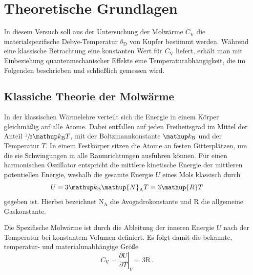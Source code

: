 \section{Theoretische Grundlagen}
\label{sec:theorie}
In diesem Versuch soll aus der Untersuchung der Molwärme $C_\mathrm{V}$
die materialspezifische Debye-Temperatur $\theta_\text{D}$ von Kupfer
bestimmt werden.
Während eine klassische Betrachtung eine konstanten Wert für $C_\mathrm{V}$
liefert, erhält man mit Einbeziehung quantenmechanischer Effekte eine
Temperaturabhängigkeit, die im Folgenden beschrieben und schließlich 
gemessen wird.

\subsection{Klassiche Theorie der Molwärme}
\label{subsec:klassisch}
In der klassischen Wärmelehre verteilt sich die Energie in einem Körper
gleichmäßig auf alle Atome. Dabei entfallen auf jeden Freiheitsgrad im Mittel
der Anteil $\sfrac{1}{2}\kb T$, mit der Boltzmannkonstante $\kb$ und der
Temperatur $T$.
In einem Festkörper sitzen die Atome an festen Gitterplätzen, um die sie
Schwingungen in alle Raumrichtungen ausführen können. Für einen harmonischen
Oszillator entspricht die mittlere kinetische Energie der mittleren
potentiellen Energie, weshalb die gesamte Energie $U$ eines Mols klassisch
durch
\begin{equation}
    \label{eqn:innere_energie}
    U = 3 \kb \mathup{N}_\text{A} T = 3\mathup{R}T
\end{equation}
gegeben ist. Hierbei bezeichnet $\mathup{N}_\text{A}$ die Avogadrokonstante
und $\mathup{R}$ die allgemeine Gaskonstante.

Die Spezifische Molwärme ist durch die Ableitung der inneren Energie $U$ nach
der Temperatur bei konstantem Volumen definiert. Es folgt damit
die bekannte, temperatur- und materialunabhängige Größe
\begin{equation}
    \label{eqn:cv_klassisch}
    C_\mathrm{V} = \left.\frac{\partial U}{\partial T}\right|_V = 3 \mathup{R}\,.
\end{equation}

